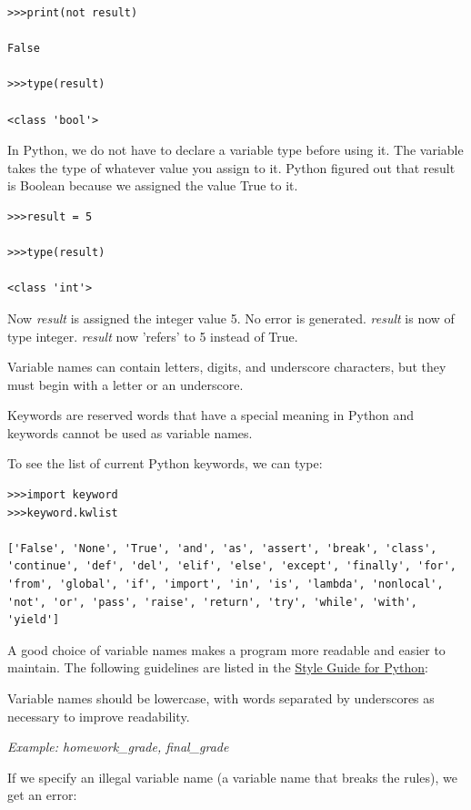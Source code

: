 \documentclass{article}
\begin{document}
\begin{lstlisting}
>>>print(not result)

False

>>>type(result)

<class 'bool'>

\end{lstlisting}

In Python, we do not have to declare a variable type before using it.  The variable takes the type of whatever value you assign to it.  Python figured out that result is Boolean because we assigned the value True to it.  

\begin{lstlisting}
>>>result = 5

>>>type(result)

<class 'int'>
\end{lstlisting}

Now \textit{result} is assigned the integer value 5.  No error is generated.  \textit{result} is now of type integer.  \textit{result} now 'refers' to 5 instead of True.

Variable names can contain letters,  digits, and underscore characters, but they must begin with a letter or an underscore.  

Keywords are reserved words that have a special meaning in Python and keywords cannot be used as variable names. 

To see the list of current Python keywords, we can type:

\begin{lstlisting}
>>>import keyword
>>>keyword.kwlist

['False', 'None', 'True', 'and', 'as', 'assert', 'break', 'class', 'continue', 'def', 'del', 'elif', 'else', 'except', 'finally', 'for', 'from', 'global', 'if', 'import', 'in', 'is', 'lambda', 'nonlocal', 'not', 'or', 'pass', 'raise', 'return', 'try', 'while', 'with', 'yield']

\end{lstlisting}

A good choice of variable names makes a program more readable and easier to maintain.  The following guidelines are listed in the \href{https://www.python.org/dev/peps/pep-0008/}{Style Guide for Python}:

Variable names should be lowercase, with words separated by underscores as necessary to improve readability.

\emph{Example: homework{\_}grade,  final{\_}grade}

If we specify an illegal variable name (a variable name that breaks the rules), we get an error:
\end{document}
